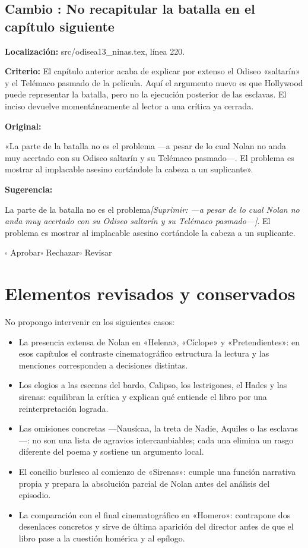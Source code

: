 \documentclass[12pt,a4paper]{article}
\newcommand{\quita}[1]{\textcolor{rojocambio}{\textit{[Suprimir: #1]}}}
\newcounter{cambio}
\newcommand{\propuesta}[5]{%
  \refstepcounter{cambio}%
  \subsection*{Cambio \thecambio: #1}
  \noindent\textbf{Localización:} #2.\par
  \noindent\textbf{Criterio:} #3\par
  \medskip
  \noindent\textbf{Original:}\par
  #4\par
  \medskip
  \noindent\textbf{Sugerencia:}\par
  #5\par
  \medskip
  \noindent$\square$ Aprobar\qquad$\square$ Rechazar\qquad$\square$ Revisar
  \par\bigskip
}
\begin{document}
\propuesta
  {No recapitular la batalla en el capítulo siguiente}
  {src/odisea13\_ninas.tex, línea 220}
  {El capítulo anterior acaba de explicar por extenso el Odiseo «saltarín» y el Telémaco pasmado de la película. Aquí el argumento nuevo es que Hollywood puede representar la batalla, pero no la ejecución posterior de las esclavas. El inciso devuelve momentáneamente al lector a una crítica ya cerrada.}
  {«La parte de la batalla no es el problema ---a pesar de lo cual Nolan no anda muy acertado con su Odiseo saltarín y su Telémaco pasmado---. El problema es mostrar al implacable asesino cortándole la cabeza a un suplicante».}
  {La parte de la batalla no es el problema\quita{ ---a pesar de lo cual Nolan no anda muy acertado con su Odiseo saltarín y su Telémaco pasmado---}. El problema es mostrar al implacable asesino cortándole la cabeza a un suplicante.}

\section*{Elementos revisados y conservados}

No propongo intervenir en los siguientes casos:

\begin{itemize}[leftmargin=*]
  \item La presencia extensa de Nolan en «Helena», «Cíclope» y «Pretendientes»: en esos capítulos el contraste cinematográfico estructura la lectura y las menciones corresponden a decisiones distintas.
  \item Los elogios a las escenas del bardo, Calipso, los lestrigones, el Hades y las sirenas: equilibran la crítica y explican qué entiende el libro por una reinterpretación lograda.
  \item Las omisiones concretas ---Nausícaa, la treta de Nadie, Aquiles o las esclavas---: no son una lista de agravios intercambiables; cada una elimina un rasgo diferente del poema y sostiene un argumento local.
  \item El concilio burlesco al comienzo de «Sirenas»: cumple una función narrativa propia y prepara la absolución parcial de Nolan antes del análisis del episodio.
  \item La comparación con el final cinematográfico en «Homero»: contrapone dos desenlaces concretos y sirve de última aparición del director antes de que el libro pase a la cuestión homérica y al epílogo.
\end{itemize}
\end{document}
